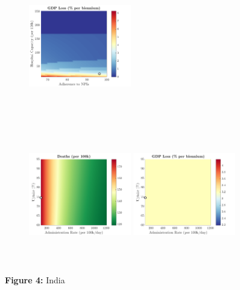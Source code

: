 \documentclass[paper=a4, fontsize=11pt]{scrartcl}
\numberwithin{figure}{section}
\numberwithin{table}{section}
\begin{document}
\begin{figure}[H]
\begin{subfigure}[b]{\textwidth}
	\hspace{0.05cm}
    	\includegraphics[width=0.49\textwidth,height=6cm]{IN/SPANISH/npl_g}
    \end{subfigure}
    \begin{subfigure}[b]{\textwidth}
      	\includegraphics[width=0.49\textwidth,height=6cm]{IN/SPANISH/imm_d}
	\hspace{0.05cm}
    	\includegraphics[width=0.49\textwidth,height=6cm]{IN/SPANISH/imm_g}
    \end{subfigure}
\caption*{\textbf{Figure 4:} India} 
\end{figure}
\end{document}
